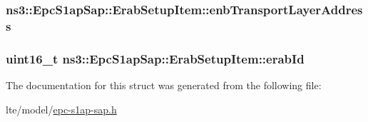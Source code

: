 \subsubsection[{\texorpdfstring{enb\+Transport\+Layer\+Address}{enbTransportLayerAddress}}]{ ns3\+::\+Epc\+S1ap\+Sap\+::\+Erab\+Setup\+Item\+::enb\+Transport\+Layer\+Address}\hypertarget{structns3_1_1EpcS1apSap_1_1ErabSetupItem_a6509d14b5dcb8a8dc70386b90efbaeaa}{}\label{structns3_1_1EpcS1apSap_1_1ErabSetupItem_a6509d14b5dcb8a8dc70386b90efbaeaa}
\subsubsection[{\texorpdfstring{erab\+Id}{erabId}}]{\setlength{\rightskip}{0pt plus 5cm}uint16\+\_\+t ns3\+::\+Epc\+S1ap\+Sap\+::\+Erab\+Setup\+Item\+::erab\+Id}\hypertarget{structns3_1_1EpcS1apSap_1_1ErabSetupItem_a138f70c0f326bfb3a319d8486aaad070}{}\label{structns3_1_1EpcS1apSap_1_1ErabSetupItem_a138f70c0f326bfb3a319d8486aaad070}


The documentation for this struct was generated from the following file\+:\begin{DoxyCompactItemize}
\item 
lte/model/\hyperlink{epc-s1ap-sap_8h}{epc-\/s1ap-\/sap.\+h}\end{DoxyCompactItemize}
